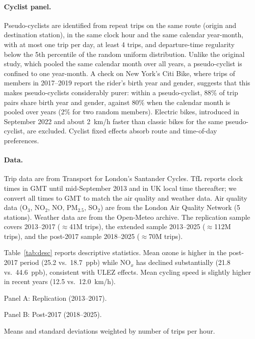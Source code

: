 \documentclass[12pt]{article}
\begin{document}
\paragraph{Cyclist panel.} Pseudo-cyclists are identified from repeat trips on the same route (origin and destination station), in the same clock hour and the same calendar year-month, with at most one trip per day, at least 4 trips, and departure-time regularity below the 5th percentile of the random uniform distribution. Unlike the original study, which pooled the same calendar month over all years, a pseudo-cyclist is confined to one year-month. A check on New York's Citi Bike, where trips of members in 2017--2019 report the rider's birth year and gender, suggests that this makes pseudo-cyclists considerably purer: within a pseudo-cyclist, 88\% of trip pairs share birth year and gender, against 80\% when the calendar month is pooled over years (2\% for two random members). Electric bikes, introduced in September 2022 and about 2~km/h faster than classic bikes for the same pseudo-cyclist, are excluded. Cyclist fixed effects absorb route and time-of-day preferences.

\paragraph{Data.} Trip data are from Transport for London's Santander Cycles. TfL reports clock times in GMT until mid-September 2013 and in UK local time thereafter; we convert all times to GMT to match the air quality and weather data. Air quality data (O$_3$, NO$_2$, NO, PM$_{2.5}$, SO$_2$) are from the London Air Quality Network (5 stations). Weather data are from the Open-Meteo archive. The replication sample covers 2013--2017 ($\approx$41M trips), the extended sample 2013--2025 ($\approx$112M trips), and the post-2017 sample 2018--2025 ($\approx$70M trips).

Table~\ref{tab:desc} reports descriptive statistics. Mean ozone is higher in the post-2017 period (25.2 vs.\ 18.7~ppb) while NO$_x$ has declined substantially (21.8 vs.\ 44.6~ppb), consistent with ULEZ effects. Mean cycling speed is slightly higher in recent years (12.5 vs.\ 12.0~km/h).

\begin{table}[H]
\centering
\caption{Descriptive statistics (hourly, trip-weighted).}
\label{tab:desc}

\medskip
\small Panel A: Replication (2013--2017).



\medskip
\small Panel B: Post-2017 (2018--2025).



\medskip
\footnotesize Means and standard deviations weighted by number of trips per hour.
\end{table}
\end{document}
